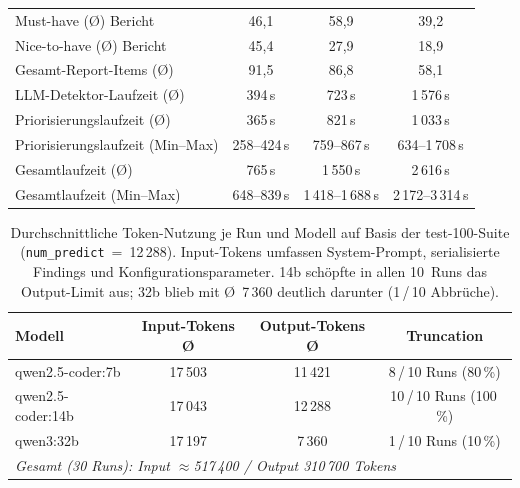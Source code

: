 \begin{table}[htbp]
{\begin{tabular}{|l|c|c|c|}
Must-have (Ø) Bericht                          & 46{,}1           & 58{,}9             & 39{,}2 \\
Nice-to-have (Ø) Bericht                       & 45{,}4           & 27{,}9             & 18{,}9 \\
Gesamt-Report-Items (Ø)                        & 91{,}5           & 86{,}8             & 58{,}1 \\
LLM-Detektor-Laufzeit (Ø)                      & 394\,s           & 723\,s              & 1\,576\,s \\
Priorisierungslaufzeit (Ø)                     & 365\,s           & 821\,s              & 1\,033\,s \\
Priorisierungslaufzeit (Min--Max)              & 258--424\,s      & 759--867\,s        & 634--1\,708\,s \\
Gesamtlaufzeit (Ø)                             & 765\,s           & 1\,550\,s           & 2\,616\,s \\
Gesamtlaufzeit (Min--Max)                      & 648--839\,s      & 1\,418--1\,688\,s   & 2\,172--3\,314\,s \\
\hline
\end{tabular}
}%
\label{tab:modell_summary_100}
\end{table}
 
\clearpage
 
\label{app:token_economy_100}
 
\begin{table}[htbp]
\centering
\setlength{\tabcolsep}{4pt}
\renewcommand{\arraystretch}{1.2}
\caption[Token-Nutzung pro Modell (test-100)]{Durchschnittliche Token-Nutzung je Run und Modell auf Basis der test-100-Suite (\texttt{num\_predict}~=~12\,288). Input-Tokens umfassen System-Prompt, serialisierte Findings und Konfigurationsparameter. 14b schöpfte in allen 10~Runs das Output-Limit aus; 32b blieb mit Ø~7\,360 deutlich darunter (1\,/\,10 Abbrüche).}
\begin{tabular}{|l|c|c|c|}
\hline
\textbf{Modell} & \textbf{Input-Tokens Ø} & \textbf{Output-Tokens Ø} & \textbf{Truncation} \\
\hline
qwen2.5-coder:7b  & 17\,503 & 11\,421 & 8\,/\,10 Runs (80\,\%) \\
\hline
qwen2.5-coder:14b & 17\,043 & 12\,288 & 10\,/\,10 Runs (100\,\%) \\
\hline
qwen3:32b         & 17\,197 &  7\,360 &  1\,/\,10 Runs (10\,\%) \\
\hline
\multicolumn{4}{|l|}{\textit{Gesamt (30 Runs): Input $\approx$517\,400 / Output 310\,700 Tokens}} \\
\hline
\end{tabular}
\label{tab:token_economy_100}
\end{table}
 
